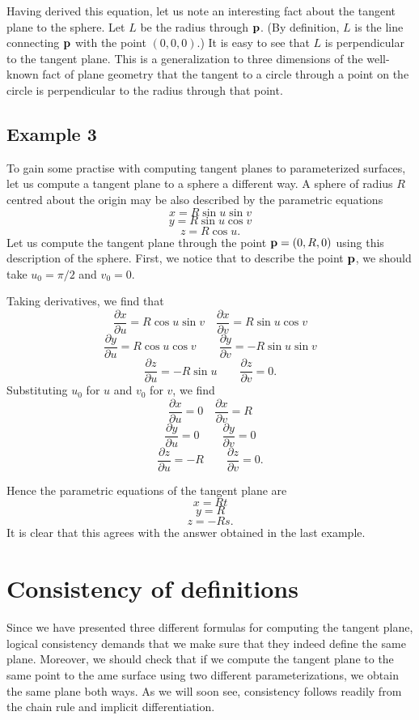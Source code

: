\documentclass[12pt]{article}
\begin{document}
Having derived this equation, let us note an interesting fact about the tangent plane to the sphere.  Let $L$ be the radius through ${\bf p}$. (By definition, $L$ is the line connecting ${\bf p}$ with the point $(0, 0, 0)$.)  It is easy to see that $L$ is perpendicular to the tangent plane.  This is a generalization to three dimensions of the well-known fact of plane geometry that the tangent to a circle through a point on the circle is perpendicular to the radius through that point.

\subsection{Example 3}

To gain some practise with computing tangent planes to parameterized surfaces, let us compute a tangent plane to a sphere a different way.  A sphere of radius $R$ centred about the origin may be also described by the parametric equations
 $$x = R \sin u \sin v$$
 $$y = R \sin u \cos v$$
 $$z = R \cos u.$$
Let us compute the tangent plane through the point ${\bf p} = (0,R,0)$ using this description of the sphere.  First, we notice that to describe the point ${\bf p}$, we should take $u_0 = \pi / 2$ and $v_0 = 0$.

Taking derivatives, we find that
 $$\frac{\partial x}{\partial u} = R \cos u \sin v \quad \frac{\partial x}{\partial v} = R \sin u \cos v$$
 $$\frac{\partial y}{\partial u} = R \cos u \cos v \qquad \frac{\partial y}{\partial v} = - R \sin u \sin v$$
 $$\frac{\partial z}{\partial u} = - R \sin u \qquad \frac{\partial z}{\partial v} = 0.$$
Substituting $u_0$ for $u$ and $v_0$ for $v$, we find
$$\frac{\partial x}{\partial u} = 0 \quad \frac{\partial x}{\partial v} = R$$
 $$\frac{\partial y}{\partial u} = 0 \qquad \frac{\partial y}{\partial v} = 0$$
 $$\frac{\partial z}{\partial u} = - R \qquad \frac{\partial z}{\partial v} = 0.$$

Hence the parametric equations of the tangent plane are
 $$x = Rt$$
 $$y = R$$
 $$z = -Rs .$$
It is clear that this agrees with the answer obtained in the last example.

\section {Consistency of definitions}

Since we have presented three different formulas for computing the tangent plane, logical consistency demands that we make sure that they indeed define the same plane.  Moreover, we should check that if we compute the tangent plane to the same point to the ame surface using two different parameterizations, we obtain the same plane both ways.  As we will soon see, consistency follows readily from the chain rule and implicit differentiation.
\end{document}
